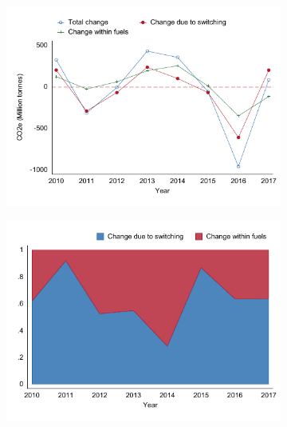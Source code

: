 \documentclass[12pt,notitlepage]{article}
\begin{document}
\begin{figure}[!htpb]
\centering
\caption{Fuel switching and change in aggregate GHG emissions}
\begin{subfigure}{.49\textwidth}
    \centering
 \includegraphics[scale=0.9]{../Output/Graphs/AggGHGChange_year_BalancedPanel.pdf}
\end{subfigure}%
\begin{subfigure}{.49\textwidth}
    \centering
 \includegraphics[scale=0.9]{../Output/Graphs/AggGHGChange_Decomposition_BalancedPanel.pdf}
\end{subfigure}
\end{figure}
\pagebreak
\end{document}
